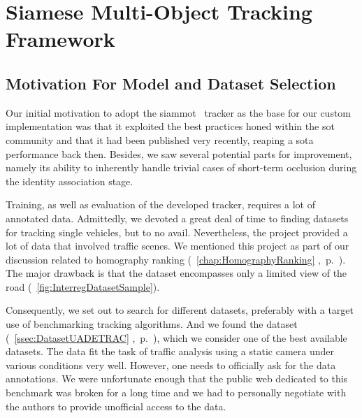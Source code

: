 \section{Siamese Multi-Object Tracking Framework}
\label{sec:SiamMOT}

\subsection{Motivation For Model and Dataset Selection}

Our initial motivation to adopt the \gls{siammot}~\cite{shuai2021siammot} tracker as the base for our custom implementation was that it exploited the best practices honed within the \gls{sot} community and that it had been published very recently, reaping a \gls{sota} performance back then. Besides, we saw several potential parts for improvement, namely its ability to inherently handle trivial cases of short-term occlusion during the identity association stage.

Training, as well as evaluation of the developed tracker, requires a lot of annotated data. Admittedly, we devoted a great deal of time to finding datasets for tracking single vehicles, but to no avail. Nevertheless, the \interreg{} project provided a lot of data that involved traffic scenes. We mentioned this project as part of our discussion related to homography ranking (\chaptertext{}~\ref{chap:HomographyRanking} ,~p.~\pageref{chap:HomographyRanking}). The major drawback is that the dataset encompasses only a limited view of the road (\figtext{}~\ref{fig:InterregDatasetSample}).

Consequently, we set out to search for different datasets, preferably with a target use of benchmarking tracking algorithms. And we found the \uadetrac{} dataset (\sectiontext{}~\ref{ssec:DatasetUADETRAC} ,~p.~\pageref{ssec:DatasetUADETRAC}), which we consider one of the best available datasets. The data fit the task of traffic analysis using a static camera under various conditions very well. However, one needs to officially ask for the data annotations. We were unfortunate enough that the public web dedicated to this benchmark was broken for a long time and we had to personally negotiate with the authors to provide unofficial access to the data.

